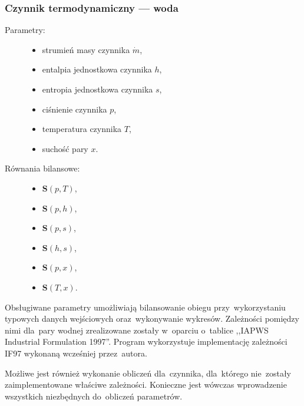 \subsubsection{Czynnik termodynamiczny --- woda}
\label{czynnik-woda}

\begin{description}

	\item[Parametry:] \hfill

		\begin{itemize}

			\item strumień masy czynnika $\dot m$,

			\item entalpia jednostkowa czynnika $h$,

			\item entropia jednostkowa czynnika $s$,

			\item ciśnienie czynnika $p$,

			\item temperatura czynnika $T$,

			\item suchość pary $x$.

		\end{itemize}

	\item[Równania bilansowe:] \hfill

		\begin{itemize}

			\item $\mathbf{S}(p, T)$,
			\item $\mathbf{S}(p, h)$,
			\item $\mathbf{S}(p, s)$,
			\item $\mathbf{S}(h, s)$,
			\item $\mathbf{S}(p, x)$,
			\item $\mathbf{S}(T, x)$.

		\end{itemize}

\end{description}

Obsługiwane parametry umożliwiają bilansowanie obiegu przy~wykorzystaniu
typowych danych wejściowych oraz~wykonywanie wykresów. Zależności
pomiędzy nimi dla~pary wodnej zrealizowane zostały w~oparciu o~tablice
,,IAPWS Industrial Formulation 1997''. Program wykorzystuje
implementację zależności IF97 wykonaną wcześniej przez~autora.

Możliwe jest również wykonanie obliczeń dla~czynnika, dla~którego
nie~zostały zaimplementowane właściwe zależności. Konieczne jest wówczas
wprowadzenie wszystkich niezbędnych do~obliczeń parametrów.
